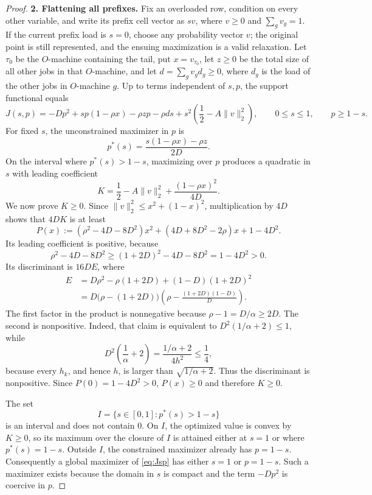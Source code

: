 \documentclass[11pt]{article}
\theoremstyle{remark}
\begin{document}
\begin{proof}
\medskip
\noindent
\textbf{2. Flattening all prefixes.}
Fix an overloaded row, condition on every other variable, and write its
prefix cell vector as $sv$, where $v\geq0$ and
$\sum_gv_g=1$.  If the current prefix load is $s=0$, choose any
probability vector $v$; the original point is still represented, and
the ensuing maximization is a valid relaxation.  Let $\tau_0$ be the
$O$-machine containing the
tail, put $x=v_{\tau_0}$, let $z\geq0$ be the total size of all other
jobs in that $O$-machine, and let
$d=\sum_gv_gd_g\geq0$, where $d_g$ is the load of the other jobs in
$O$-machine $g$.  Up to terms independent of $s,p$, the support
functional equals
\begin{equation}\label{eq:Jsp}
 J(s,p)=-Dp^2+sp(1-\rho x)-\rho zp-\rho ds
 +s^2\left(\frac12-A\lVert v\rVert_2^2\right),
 \qquad 0\leq s\leq1,\qquad p\geq1-s.
\end{equation}
For fixed $s$, the unconstrained maximizer in $p$ is
\[
 p^*(s)=\frac{s(1-\rho x)-\rho z}{2D}.
\]
On the interval where $p^*(s)>1-s$, maximizing over $p$ produces a
quadratic in $s$ with leading coefficient
\begin{equation}\label{eq:K-leading}
 K=\frac12-A\lVert v\rVert_2^2
       +\frac{(1-\rho x)^2}{4D}.
\end{equation}
We now prove $K\geq0$.  Since
$\lVert v\rVert_2^2\leq x^2+(1-x)^2$, multiplication by $4D$
shows that $4DK$ is at least
\begin{equation}\label{eq:P-x}
 P(x):=(\rho^2-4D-8D^2)x^2
 +(4D+8D^2-2\rho)x+1-4D^2.
\end{equation}
Its leading coefficient is positive, because
\[
 \rho^2-4D-8D^2
 \geq(1+2D)^2-4D-8D^2=1-4D^2>0.
\]
Its discriminant is $16D E$, where
\begin{align*}
 E&=D\rho^2-\rho(1+2D)+(1-D)(1+2D)^2\\
  &=D\bigl(\rho-(1+2D)\bigr)
     \left(\rho-\frac{(1+2D)(1-D)}D\right).
\end{align*}
The first factor in the product is nonnegative because
$\rho-1=D/\alpha\geq2D$.  The second is nonpositive.  Indeed, that
claim is equivalent to
$D^2(1/\alpha+2)\leq1$, while
\[
 D^2\left(\frac1\alpha+2\right)
 =\frac{1/\alpha+2}{4h^2}\leq\frac14,
\]
because every $h_k$, and hence $h$, is larger than
$\sqrt{1/\alpha+2}$.  Thus the discriminant is nonpositive.
Since $P(0)=1-4D^2>0$, $P(x)\geq0$ and therefore $K\geq0$.

The set
\[
 I=\{s\in[0,1]:p^*(s)>1-s\}
\]
is an interval and does not contain $0$.  On $I$, the optimized
value is convex by $K\geq0$, so its maximum over the closure of $I$
is attained either at $s=1$ or where $p^*(s)=1-s$.  Outside $I$,
the constrained maximizer already has $p=1-s$.  Consequently a global
maximizer of \eqref{eq:Jsp} has either $s=1$ or $p=1-s$.  Such a
maximizer exists because the domain in $s$ is compact and the term
$-Dp^2$ is coercive in $p$.


\end{proof}
\end{document}
